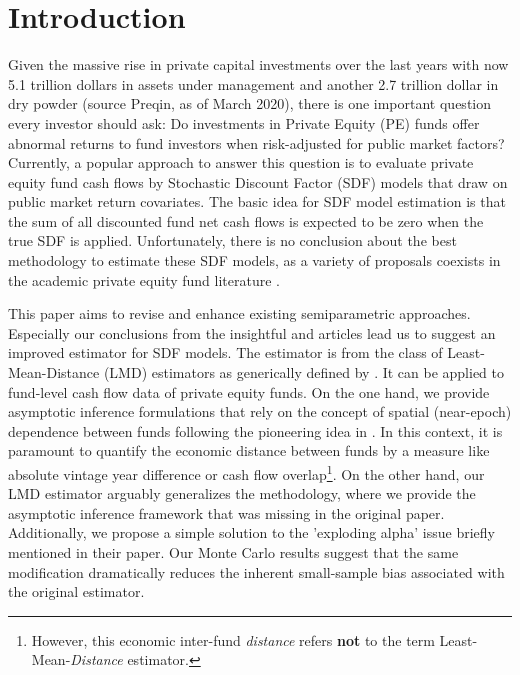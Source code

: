 \documentclass[12pt]{article}
\begin{document}
\section{Introduction}

Given the massive rise in private capital investments over the last years with now 5.1 trillion dollars in assets under management and another 2.7 trillion dollar in dry powder (source Preqin, as of March 2020), there is one important question every investor should ask:
Do investments in Private Equity (PE) funds offer abnormal returns to fund investors when risk-adjusted for public market factors?
Currently, a popular approach to answer this question is to evaluate private equity fund cash flows by Stochastic Discount Factor (SDF) models that draw on public market return covariates.
The basic idea for SDF model estimation is that the sum of all discounted fund net cash flows is expected to be zero when the true SDF is applied.
Unfortunately, there is no conclusion about the best methodology to estimate these SDF models, as a variety of proposals coexists in the academic private equity fund literature \citep{DLP12,B14,KN16,ACGP18,GSW19}.

This paper aims to revise and enhance existing semiparametric approaches.
Especially our conclusions from the insightful \cite{DLP12} and \cite{KN16} articles lead us to suggest an improved estimator for SDF models.
The estimator is from the class of Least-Mean-Distance (LMD) estimators as generically defined by \cite{PP97}.
It can be applied to fund-level cash flow data of private equity funds.
On the one hand, we provide asymptotic inference formulations that rely on the concept of spatial (near-epoch) dependence between funds following the pioneering idea in \cite{KN16}.
In this context, it is paramount to quantify the economic distance between funds by a measure like absolute vintage year difference or cash flow overlap\footnote{However, this economic inter-fund \emph{distance} refers \textbf{not} to the term Least-Mean-\emph{Distance} estimator.}.
On the other hand, our LMD estimator arguably generalizes the \cite{DLP12} methodology, where we provide the asymptotic inference framework that was missing in the original paper.
Additionally, we propose a simple solution to the 'exploding alpha' issue briefly mentioned in their paper.
Our Monte Carlo results suggest that the same modification dramatically reduces the inherent small-sample bias associated with the original \cite{DLP12} estimator.
\end{document}
